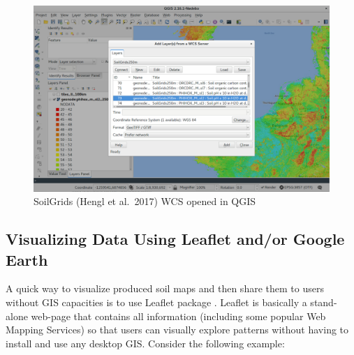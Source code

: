 \documentclass[10pt,b5paper,]{book}
\theoremstyle{definition}
\theoremstyle{definition}
\theoremstyle{definition}
\theoremstyle{remark}
\begin{document}
\begin{figure}
\centering
\includegraphics{images/Data_sharing_SoilGrids.png}
\caption{SoilGrids (Hengl et al.~2017) WCS opened in QGIS}
\end{figure}

\hypertarget{visualizing-data-using-leaflet-andor-google-earth}{%
\subsection{Visualizing Data Using Leaflet and/or Google
Earth}\label{visualizing-data-using-leaflet-andor-google-earth}}

A quick way to visualize produced soil maps and then share them to users
without GIS capacities is to use Leaflet package . Leaflet is basically
a stand-alone web-page that contains all information (including some
popular Web Mapping Services) so that users can visually explore
patterns without having to install and use any desktop GIS. Consider the
following example:
\end{document}

